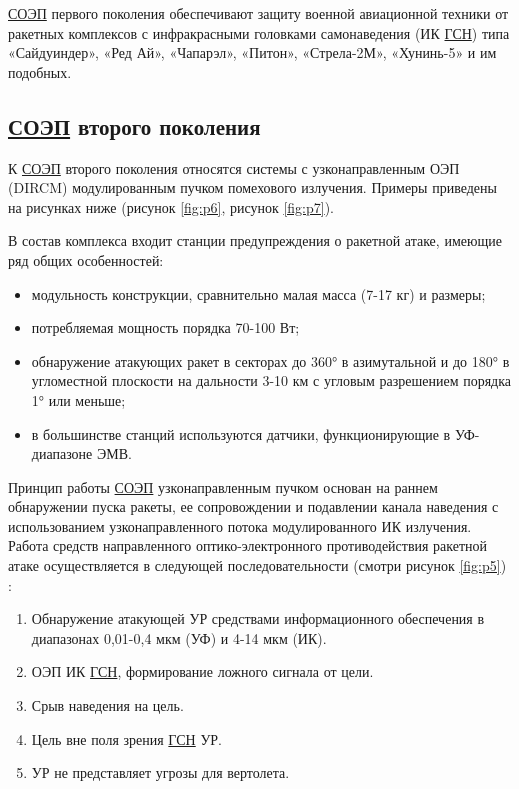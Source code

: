  \hyperref[acroSOEP]{СОЭП} первого поколения обеспечивают защиту военной авиационной техники от ракетных комплексов с инфракрасными головками самонаведения (ИК \hyperref[acroGSN]{ГСН}) типа «Сайдуиндер», «Ред Ай», «Чапарэл», «Питон», «Стрела-2М», «Хунинь-5» и им подобных. 

\subsection{ \hyperref[acroSOEP]{СОЭП} второго поколения}	

К  \hyperref[acroSOEP]{СОЭП} второго поколения относятся системы с узконаправленным ОЭП (DIRCM) модулированным пучком помехового излучения. Примеры приведены на рисунках ниже (рисунок \ref{fig:p6}, рисунок \ref{fig:p7}).

В состав комплекса входит станции предупреждения о ракетной атаке, имеющие ряд общих особенностей:
\begin{itemize}
	\item модульность конструкции, сравнительно малая масса (7-17 кг) и размеры;
	\item потребляемая мощность порядка 70-100 Вт;
	\item обнаружение атакующих ракет в секторах до 360° в азимутальной и до 180° в угломестной плоскости на дальности 3-10 км с угловым разрешением порядка 1° или меньше;
	\item в большинстве станций используются датчики, функционирующие в УФ-диапазоне ЭМВ.
\end{itemize}

Принцип работы  \hyperref[acroSOEP]{СОЭП} узконаправленным пучком основан на раннем обнаружении пуска ракеты, ее сопровождении и подавлении канала наведения с использованием узконаправленного потока модулированного ИК излучения. Работа средств направленного оптико-электронного противодействия ракетной атаке осуществляется в следующей последовательности (смотри рисунок \ref{fig:p5}) \cite[]{ForeignMilitary}:

\begin{enumerate}
	\item Обнаружение атакующей УР средствами информационного обеспечения в диапазонах 0,01-0,4 мкм (УФ) и 4-14 мкм (ИК).
	\item ОЭП ИК \hyperref[acroGSN]{ГСН}, формирование ложного сигнала от цели. 
	\item Срыв наведения на цель. 
	\item Цель вне поля зрения \hyperref[acroGSN]{ГСН} УР. 
	\item УР не представляет угрозы для вертолета.	
\end{enumerate}

